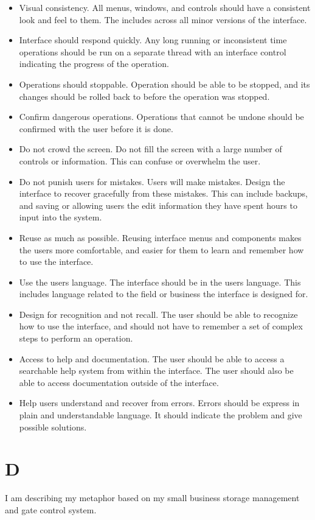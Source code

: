 \documentclass[12pt]{article}
\begin{document}
\begin{itemize}

\item Visual consistency.  All menus, windows, and controls should have a
consistent look and feel to them.  The includes across all minor versions
of the interface.

\item Interface should respond quickly.  Any long running or inconsistent 
time operations should be run on a separate thread with an interface control
indicating the progress of the operation.

\item Operations should stoppable.  Operation should be able to be
stopped, and its changes should be rolled back to before the operation
was stopped.

\item Confirm dangerous operations.  Operations that cannot be undone 
should be confirmed with the user before it is done.

\item Do not crowd the screen.  Do not fill the screen with a large number
of controls or information.  This can confuse or overwhelm the user.

\item Do not punish users for mistakes.  Users will make mistakes.  Design
the interface to recover gracefully from these mistakes.  This can include
backups, and saving or allowing users the edit information they have
spent hours to input into the system.

\item Reuse as much as possible.  Reusing interface menus and components
makes the users more comfortable, and easier for them to learn and remember
how to use the interface.

\item Use the users language.  The interface should be in the users
language.  This includes language related to the field or business the
interface is designed for.

\item Design for recognition and not recall.  The user should be able to
recognize how to use the interface, and should not have to remember a set 
of complex steps to perform an operation.

\item Access to help and documentation.  The user should be able to access 
a searchable help system from within the interface.  The user should also
be able to access documentation outside of the interface.  

\item Help users understand and recover from errors.  Errors should be
express in plain and understandable language.  It should indicate the 
problem and give possible solutions.

\end{itemize}

\section*{D}

I am describing my metaphor based on my small business storage management 
and gate control system.
\end{document}
